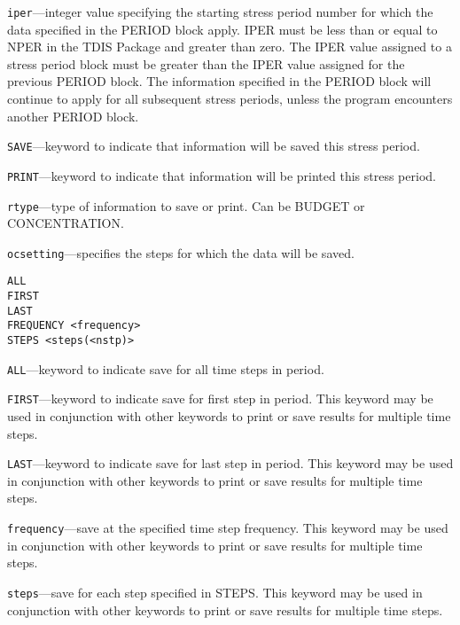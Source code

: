 \begin{description}
\item \texttt{iper}---integer value specifying the starting stress period number for which the data specified in the PERIOD block apply.  IPER must be less than or equal to NPER in the TDIS Package and greater than zero.  The IPER value assigned to a stress period block must be greater than the IPER value assigned for the previous PERIOD block.  The information specified in the PERIOD block will continue to apply for all subsequent stress periods, unless the program encounters another PERIOD block.

\item \texttt{SAVE}---keyword to indicate that information will be saved this stress period.

\item \texttt{PRINT}---keyword to indicate that information will be printed this stress period.

\item \texttt{rtype}---type of information to save or print.  Can be BUDGET or CONCENTRATION.

\item \texttt{ocsetting}---specifies the steps for which the data will be saved.

\begin{lstlisting}[style=blockdefinition]
ALL
FIRST
LAST
FREQUENCY <frequency>
STEPS <steps(<nstp)>
\end{lstlisting}

\item \texttt{ALL}---keyword to indicate save for all time steps in period.

\item \texttt{FIRST}---keyword to indicate save for first step in period. This keyword may be used in conjunction with other keywords to print or save results for multiple time steps.

\item \texttt{LAST}---keyword to indicate save for last step in period. This keyword may be used in conjunction with other keywords to print or save results for multiple time steps.

\item \texttt{frequency}---save at the specified time step frequency. This keyword may be used in conjunction with other keywords to print or save results for multiple time steps.

\item \texttt{steps}---save for each step specified in STEPS. This keyword may be used in conjunction with other keywords to print or save results for multiple time steps.

\end{description}

